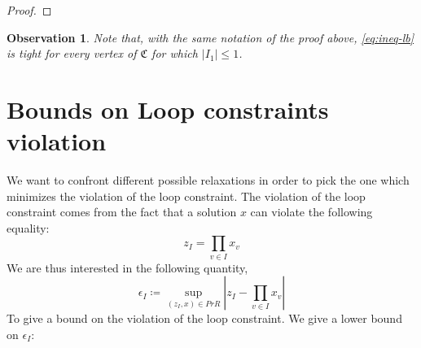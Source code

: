 \documentclass{article}
\newtheorem{observation}[theorem]{Observation}
\begin{document}
\begin{proof}
	\end{proof}
	\begin{observation}
		Note that, with the same notation of the proof above, \eqref{eq:ineq-lb} is tight for every vertex of \(\mathfrak{C}\) for which \(|I_1| \leq 1\).
	\end{observation}

\section{Bounds on Loop constraints violation}
We want to confront different possible relaxations in order to pick the one which minimizes the violation of the loop constraint.
%
The violation of the loop constraint comes from the fact that a solution \(x\) can violate the following equality: 
\[z_I = \prod_{v \in I}x_v\]
We are thus interested in the following quantity, 
\[\epsilon_I \coloneqq \sup_{(z_I,x) \in PrR} |z_I - \prod_{v \in I}x_v|
\]
To give a bound on the violation of the loop constraint.
%
We give a lower bound on \(\epsilon_I\):
\end{document}
